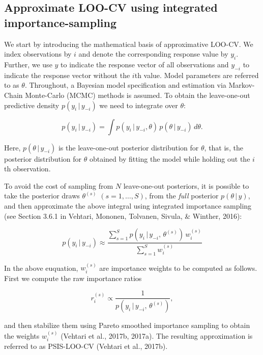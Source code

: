\documentclass[english,,doc,floatsintext]{apa6}
\theoremstyle{definition}
\theoremstyle{definition}
\theoremstyle{definition}
\theoremstyle{remark}
\begin{document}
\hypertarget{approximate-loo-cv-using-integrated-importance-sampling}{%
\subsection{Approximate LOO-CV using integrated
importance-sampling}\label{approximate-loo-cv-using-integrated-importance-sampling}}

We start by introducing the mathematical basis of approximative LOO-CV.
We index observations by \(i\) and denote the corresponding response
value by \(y_i\). Further, we use \(y\) to indicate the response vector
of all observations and \(y_{-i}\) to indicate the response vector
without the \(i\)th value. Model parameters are referred to as
\(\theta\). Throughout, a Bayesian model specification and estimation
via Markov-Chain Monte-Carlo (MCMC) methods is assumed. To obtain the
leave-one-out predictive density \(p(y_i \,|\, y_{-i})\) we need to
integrate over \(\theta\):

\begin{equation}
p(y_i\,|\,y_{-i}) =
  \int p(y_i\,|\, y_{-i}, \theta) \, p(\theta\,|\, y_{-i}) \,d \theta.
\end{equation}

Here, \(p(\theta\,|\, y_{-i})\) is the leave-one-out posterior
distribution for \(\theta\), that is, the posterior distribution for
\(\theta\) obtained by fitting the model while holding out the \(i\)th
observation.

To avoid the cost of sampling from \(N\) leave-one-out posteriors, it is
possible to take the posterior draws \(\theta^{(s)}\)
\((s=1,\ldots,S)\), from the \emph{full} posterior \(p(\theta\,|\, y)\),
and then approximate the above integral using integrated importance
sampling (see Section 3.6.1 in Vehtari, Mononen, Tolvanen, Sivula, \&
Winther, 2016):

\begin{equation}
 p(y_i\,|\, y_{-i}) \approx
   \frac{ \sum_{s=1}^S p(y_i\,|\,y_{-i},\,\theta^{(s)}) \,w_i^{(s)}}{ \sum_{s=1}^S w_i^{(s)}}
\end{equation}

In the above euquation, \(w_i^{(s)}\) are importance weights to be
computed as follows. First we compute the raw importance ratios

\begin{equation}
  r_i^{(s)} \propto \frac{1}{p(y_i \,|\, y_{-i}, \, \theta^{(s)})},
\end{equation}

and then stabilize them using Pareto smoothed importance sampling to
obtain the weights \(w_i^{(s)}\) (Vehtari et al., 2017b, 2017a). The
resulting approximation is referred to as PSIS-LOO-CV (Vehtari et al.,
2017b).
\end{document}
